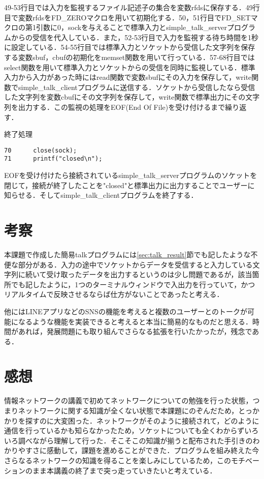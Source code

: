 \documentclass[a4j]{jarticle}
\newenvironment{bit}{\begin{breakitembox}}{\end{breakitembox}} %
\newcommand{\sts}{simple\_talk\_serverプログラム}
\newcommand{\stc}{simple\_talk\_clientプログラム}
\begin{document}
49-53行目では入力を監視するファイル記述子の集合を変数rfdsに保存する．49行目で変数rfdsをFD\_ZEROマクロを用いて初期化する．50，51行目でFD\_SETマクロの第1引数に0，sockを与えることで標準入力と\sts からの受信を代入している．また，52-53行目で入力を監視する待ち時間を1秒に設定している．54-55行目では標準入力とソケットから受信した文字列を保存する変数sbuf，cbufの初期化をmemset関数を用いて行っている．57-68行目ではselect関数を用いて標準入力とソケットからの受信を同時に監視している．標準入力から入力があった時にはread関数で変数sbufにその入力を保存して，write関数で\stc に送信する．ソケットから受信したなら受信した文字列を変数cbufにその文字列を保存して，write関数で標準出力にその文字列を出力する．この監視の処理をEOF(End Of File)を受け付けるまで繰り返す．

\begin{bit}[l]{終了処理}
\begin{verbatim}
70		close(sock);
71		printf("closed\n");
\end{verbatim}
\end{bit}

EOFを受け付けたら接続されている\sts のソケットを閉じて，接続が終了したことを"closed"と標準出力に出力することでユーザーに知らせる．そして\stc を終了する．

\section{考察}

本課題で作成した簡易talkプログラムには\ref{sec:talk_result}節でも記したような不便な部分がある．入力の途中でソケットからデータを受信すると入力している文字列に続いて受け取ったデータを出力するというのは少し問題であるが，該当箇所でも記したように，1つのターミナルウィンドウで入出力を行っていて，かつリアルタイムで反映させるならば仕方がないことであったと考える．

他にはLINEアプリなどのSNSの機能を考えると複数のユーザーとのトークが可能になるような機能を実装できると考えると本当に簡易的なものだと思える．時間があれば，発展問題にも取り組んでさらなる拡張を行いたかったが，残念である．

\section{感想}

情報ネットワークの講義で初めてネットワークについての勉強を行った状態，つまりネットワークに関する知識が全くない状態で本課題にのぞんだため，とっかかりを探すのに大変困った．ネットワークがそのように接続されて，どのように通信を行っているかも知らなかったため，ソケットについても全くわからずいろいろ調べながら理解して行った．そこそこの知識が揃うと配布された手引きのわかりやすさに感動して，課題を進めることができた．プログラムを組み終えた今さらなるネットワークの知識を得ることを楽しみにしているため，このモチベーションのまま本講義の終了まで突っ走っていきたいと考えている．
\end{document}
